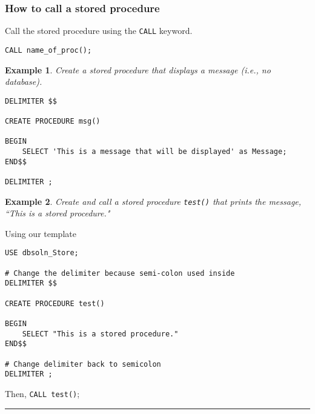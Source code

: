 \documentclass{article}
\newtheorem{example}{Example}
\begin{document}
 
\subsubsection*{How to call a stored procedure}

Call the stored procedure using the \texttt{CALL} keyword.  
\begin{lstlisting}[frame=single]  
CALL name_of_proc();
\end{lstlisting} 



\begin{example}
Create a stored procedure that displays a message (i.e., no database).
\end{example}
 
 \begin{lstlisting}[frame=single]  
DELIMITER $$

CREATE PROCEDURE msg()

BEGIN
	SELECT 'This is a message that will be displayed' as Message;
END$$

DELIMITER ;
\end{lstlisting} 
 
 
 
 
 
 \begin{example}
 Create and call a stored procedure \texttt{test()} that prints the message, ``This is a stored procedure."
 \end{example}
Using our template

\begin{lstlisting}[frame=single]  
USE dbsoln_Store;

# Change the delimiter because semi-colon used inside
DELIMITER $$

CREATE PROCEDURE test()

BEGIN
	SELECT "This is a stored procedure."	
END$$

# Change delimiter back to semicolon
DELIMITER ;

\end{lstlisting} 

Then, \texttt{CALL test()};





\hspace{-0.5cm}\rule[-0.101in]{\textwidth}{0.0025in}
  
\end{document}
